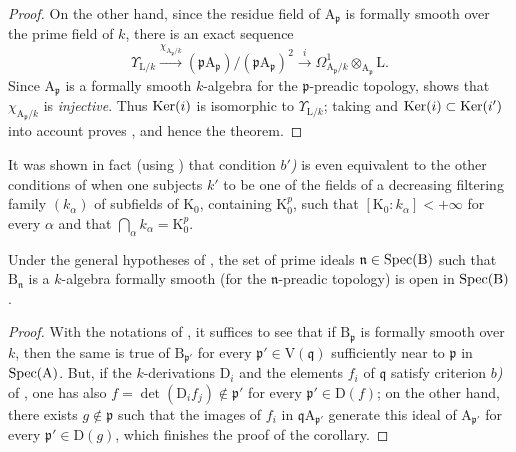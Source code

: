 \begin{proof}
On the other hand, since the residue field of $\mathrm{A}_\mathfrak{p}$ is
formally smooth over the prime field of $k$, there is an exact sequence
\[
  \Upsilon_{\mathrm{L}/k}
  \xrightarrow{\chi_{\mathrm{A}_\mathfrak{p}/k}}
  (\mathfrak{p}\mathrm{A}_\mathfrak{p})/
  (\mathfrak{p}\mathrm{A}_\mathfrak{p})^2
  \xrightarrow{i}\Omega^1_{\mathrm{A}_\mathfrak{p}/k}
  \otimes_{\mathrm{A}_\mathfrak{p}}\mathrm{L}.
\]
Since $\mathrm{A}_\mathfrak{p}$ is a formally smooth $k$-algebra for the
$\mathfrak{p}$-preadic topology,  shows that
$\chi_{\mathrm{A}_\mathfrak{p}/k}$ is \emph{injective}. Thus $\operatorname{Ker}(i)$ is isomorphic
to $\Upsilon_{\mathrm{L}/k}$; taking  and
$\operatorname{Ker}(i)\subset\operatorname{Ker}(i')$ into account proves , and hence the
theorem.
\end{proof}

\begin{remark}[22.7.4]
\label{0.22.7.4}
It was shown in fact (using ) that condition \emph{$b'$)} is even equivalent to the other conditions of  when one subjects $k'$ to be one of the fields of a decreasing filtering family $(k_\alpha)$ of subfields of $\mathrm{K}_0$, containing $\mathrm{K}_0^p$, such that $[\mathrm{K}_0:k_\alpha]<+\infty$ for every $\alpha$ and that $\bigcap_\alpha k_\alpha=\mathrm{K}_0^p$.
\end{remark}

\begin{corollary}[22.7.5]
\label{0.22.7.5}
Under the general hypotheses of , the set of prime ideals $\mathfrak{n}\in\operatorname{Spec}(\mathrm{B})$ such that $\mathrm{B}_\mathfrak{n}$ is a $k$-algebra formally smooth (for the $\mathfrak{n}$-preadic topology) is open in $\operatorname{Spec}(\mathrm{B})$.
\end{corollary}

\begin{proof}
With the notations of , it suffices to see that if $\mathrm{B}_\mathfrak{p}$ is formally smooth over $k$, then the same is true of $\mathrm{B}_{\mathfrak{p}'}$ for every $\mathfrak{p}'\in\mathrm{V}(\mathfrak{q})$ sufficiently near to $\mathfrak{p}$ in $\operatorname{Spec}(\mathrm{A})$.
But, if the $k$-derivations $\mathrm{D}_i$ and the elements $f_i$ of $\mathfrak{q}$ satisfy criterion \emph{$b$)} of , one has also $f=\det(\mathrm{D}_if_j)\notin\mathfrak{p}'$ for every $\mathfrak{p}'\in\mathrm{D}(f)$; on the other hand, there exists $g\notin\mathfrak{p}$ such that the images of $f_i$ in $\mathfrak{q}\mathrm{A}_{\mathfrak{p}'}$ generate this ideal of $\mathrm{A}_{\mathfrak{p}'}$ for every $\mathfrak{p}'\in\mathrm{D}(g)$, which finishes the proof of the corollary.
\end{proof}

